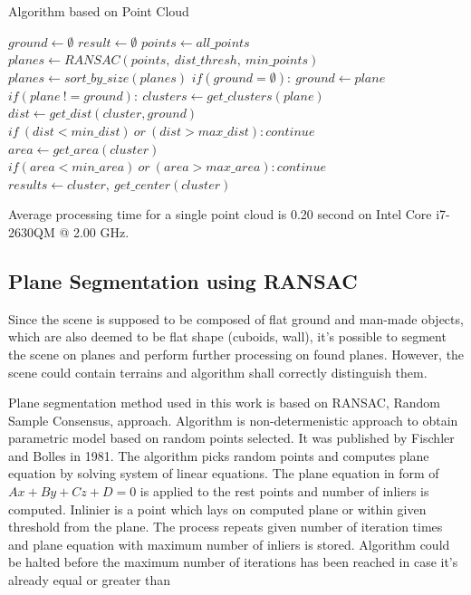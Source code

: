 \documentclass{ctuthesis}
\begin{document}
\begin{algorithm}
\caption{Algorithm based on Point Cloud}\label{depth-alg}
\begin{algorithmic}[1]
\State $ground \gets \emptyset$
\State $result \gets \emptyset$
\State $points \gets all\_points$
\State $planes \gets RANSAC(points,\ dist\_thresh,\ min\_points)$
\State $planes \gets sort\_by\_size(planes)$
\State $if (ground = \emptyset):\ ground \gets plane$
\State $if (plane\ != ground):\ clusters \gets get\_clusters(plane)$
\State $dist \gets get\_dist(cluster, ground)$
\State $if\ (dist < min\_dist)\ or\ (dist > max\_dist): continue$
\State $area \gets get\_area(cluster)$
\State $if (area < min\_area)\ or\ (area > max\_area): continue$
\State $results \gets cluster,\ get\_center(cluster)$
\EndFor
\EndFor
\end{algorithmic}
\end{algorithm}

Average processing time for a single point cloud is 0.20 second on Intel Core i7-2630QM @ 2.00 GHz. 

\subsection{Plane Segmentation using RANSAC}

Since the scene is supposed to be composed of flat ground and man-made objects, which are also deemed to be flat shape (cuboids, wall), it's possible to segment the scene on planes and perform further processing on found planes. However, the scene could contain terrains and algorithm shall correctly distinguish them.

Plane segmentation method used in this work is based on RANSAC, Random Sample Consensus, approach. Algorithm is non-determenistic approach to obtain parametric model based on random points selected. It was published by Fischler and Bolles in 1981. The algorithm picks random points and computes plane equation by solving system of linear equations. The plane equation in form of $Ax + By + Cz + D = 0$ is applied to the rest points and number of inliers is computed. Inlinier is a point which lays on computed plane or within given threshold from the plane. The process repeats given number of iteration times and plane equation with maximum number of inliers is stored. Algorithm could be halted before the maximum number of iterations has been reached in case it's already equal or greater than 
\end{document}
